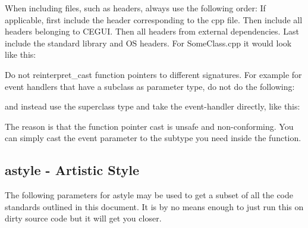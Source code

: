 \begin{DoxyItemize}
\item When including files, such as headers, always use the following order\+: If applicable, first include the header corresponding to the cpp file. Then include all headers belonging to C\+E\+G\+UI. Then all headers from external dependencies. Last include the standard library and OS headers. For Some\+Class.\+cpp it would look like this\+: 
\begin{DoxyCode}{0}
\DoxyCodeLine{\textcolor{preprocessor}{\#include "CEGUI/SomeClass.h"}}
\DoxyCodeLine{}
\DoxyCodeLine{\textcolor{preprocessor}{\#include "CEGUI/Window.h"}}
\DoxyCodeLine{}
\DoxyCodeLine{\textcolor{preprocessor}{\#include <glm/glm.hpp>}}
\DoxyCodeLine{}
\DoxyCodeLine{\textcolor{preprocessor}{\#include <algorithm>}}
\end{DoxyCode}

\item Do not reinterpret\+\_\+cast function pointers to different signatures. For example for event handlers that have a subclass as parameter type, do not do the following\+: 
\begin{DoxyCode}{0}
\end{DoxyCode}
 and instead use the superclass type and take the event-\/handler directly, like this\+: 
\begin{DoxyCode}{0}
\end{DoxyCode}
 The reason is that the function pointer cast is unsafe and non-\/conforming. You can simply cast the event parameter to the subtype you need inside the function.
\end{DoxyItemize}\hypertarget{code_standards_code_standards_sec_2_3}{}\subsection{astyle -\/ Artistic Style}\label{code_standards_code_standards_sec_2_3}
The following parameters for astyle may be used to get a subset of all the code standards outlined in this document. It is by no means enough to just run this on dirty source code but it will get you closer.


\begin{DoxyCode}{0}
\end{DoxyCode}
 
